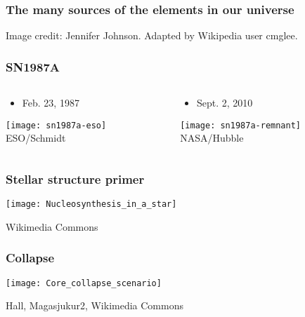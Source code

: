\documentclass[]{beamer}
\begin{document}
\begin{frame}
  \frametitle{The many sources of the elements in our universe}
  \begin{center}
    \end{center}
    Image credit: Jennifer Johnson. Adapted by Wikipedia user cmglee.
\end{frame}

\begin{frame}
  \frametitle{SN1987A}
  \begin{columns}
    \begin{column}{5cm}
      \begin{itemize}
      \item Feb. 23, 1987
      \end{itemize}
      \begin{center}
        \texttt{[image: sn1987a-eso]}\\
        ESO/Schmidt
      \end{center}
    \end{column}
    \begin{column}{7cm}
      \begin{itemize}
      \item Sept. 2, 2010
      \end{itemize}
      \begin{center}
        \texttt{[image: sn1987a-remnant]}\\
        NASA/Hubble
      \end{center}
    \end{column}
  \end{columns}
\end{frame}

\begin{frame}
  \frametitle{Stellar structure primer}
  \begin{center}
    \texttt{[image: Nucleosynthesis\_in\_a\_star]}
  \end{center}
  Wikimedia Commons
\end{frame}

\begin{frame}
  \frametitle{Collapse}
  \begin{center}
    \texttt{[image: Core\_collapse\_scenario]}
  \end{center}
  Hall, Magasjukur2, Wikimedia Commons
\end{frame}
\end{document}
